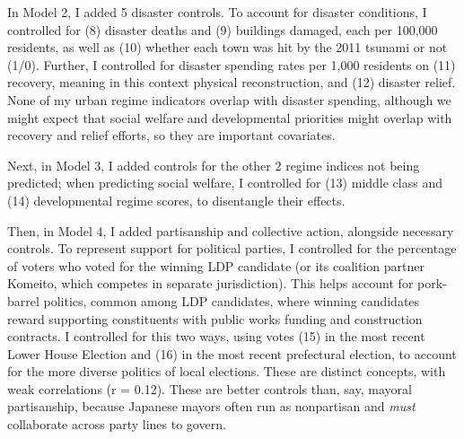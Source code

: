\documentclass[preprint, 3p,
authoryear]{elsarticle} %
\begin{document}
In Model 2, I added 5 disaster controls. To account for disaster
conditions, I controlled for (8) disaster deaths and (9) buildings
damaged, each per 100,000 residents, as well as (10) whether each town
was hit by the 2011 tsunami or not (1/0). Further, I controlled for
disaster spending rates per 1,000 residents on (11) recovery, meaning in
this context physical reconstruction, and (12) disaster relief. None of
my urban regime indicators overlap with disaster spending, although we
might expect that social welfare and developmental priorities might
overlap with recovery and relief efforts, so they are important
covariates.

Next, in Model 3, I added controls for the other 2 regime indices not
being predicted; when predicting social welfare, I controlled for (13)
middle class and (14) developmental regime scores, to disentangle their
effects.

Then, in Model 4, I added partisanship and collective action, alongside
necessary controls. To represent support for political parties, I
controlled for the percentage of voters who voted for the winning LDP
candidate (or its coalition partner Komeito, which competes in separate
jurisdiction). This helps account for pork-barrel politics, common among
LDP candidates, where winning candidates reward supporting constituents
with public works funding and construction contracts. I controlled for
this two ways, using votes (15) in the most recent Lower House Election
and (16) in the most recent prefectural election, to account for the
more diverse politics of local elections. These are distinct concepts,
with weak correlations (r = 0.12). These are better controls than, say,
mayoral partisanship, because Japanese mayors often run as nonpartisan
and \emph{must} collaborate across party lines to govern.
\end{document}
